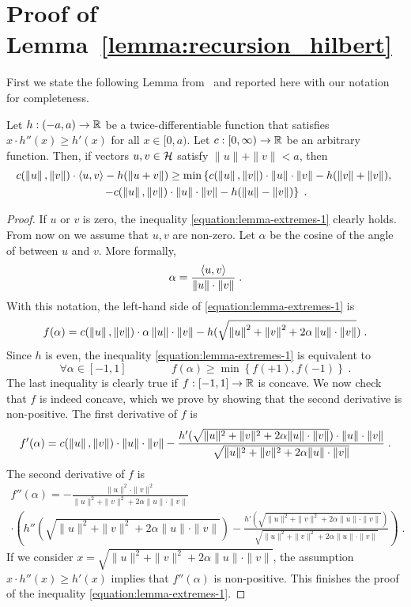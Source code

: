 \section{Proof of Lemma~\ref{lemma:recursion_hilbert}}
\label{section:hilbert-space-reduction}

First we state the following Lemma from~\cite{McMahanO14} and reported here with
our notation for completeness.

\begin{lemma}[Extremes]
\label{lemma:extremes}
Let $h:(-a,a) \to \mathbb{R}$ be a twice-differentiable function that
satisfies $x \cdot h''(x) \ge h'(x)$ for all $x \in [0,a)$. Let $c:[0,\infty) \to \mathbb{R}$
be an arbitrary function. Then, if vectors $u,v \in \mathcal{H}$ satisfy $\|u\| + \|v\| < a$, then
\begin{multline}
\label{equation:lemma-extremes-1}
c(\left\|{u}\right\|, \left\|{v}\right\|) \cdot \langle u, v \rangle - h(\left\|{u+v}\right\|)
\ge \min \left\{ c(\left\|{u}\right\|, \left\|{v}\right\|) \cdot \left\|{u}\right\| \cdot \left\|{v}\right\| - h(\left\|{v}\right\| + \left\|{v}\right\|), \right. \\
\left. - c(\left\|{u}\right\|, \left\|{v}\right\|) \cdot \left\|{u}\right\| \cdot \left\|{v}\right\| - h(\left\|{u}\right\| - \left\|{v}\right\|) \right\} \; .
\end{multline}
\end{lemma}
%
\begin{proof}
If $u$ or $v$ is zero, the inequality \eqref{equation:lemma-extremes-1} clearly
holds. From now on we assume that $u,v$ are non-zero. Let $\alpha$ be the cosine
of the angle of between $u$ and $v$. More formally,
\[
\alpha = \frac{\langle u, v \rangle}{\left\|{u}\right\| \cdot \left\|{v}\right\|} \; .
\]
With this notation, the left-hand side of \eqref{equation:lemma-extremes-1} is
\[
f(\alpha) = c(\left\|{u}\right\|, \left\|{v}\right\|) \cdot \alpha \left\|{u}\right\| \cdot \left\|{v}\right\| - h(\sqrt{\left\|{u}\right\|^2 + \left\|{v}\right\|^2 + 2 \alpha \left\|{u}\right\| \cdot \left\|{v}\right\|}) \; .
\]
Since $h$ is even, the inequality \eqref{equation:lemma-extremes-1} is equivalent to
\[
\forall \alpha \in [-1,1] \qquad \qquad f(\alpha) \ge \min \left\{f(+1), f(-1)\right\} \; .
\]
The last inequality is clearly true if $f:[-1,1] \to \mathbb{R}$ is concave. We now
check that $f$ is indeed concave, which we prove by showing that the second
derivative is non-positive. The first derivative of $f$ is
\[
f'(\alpha) = c(\left\|{u}\right\|, \left\|{v}\right\|) \cdot \|u\| \cdot \|v\| - \frac{h'(\sqrt{\|u\|^2 + \|v\|^2 + 2 \alpha \|u\| \cdot \|v\|}) \cdot \|u\| \cdot \|v\|}{\sqrt{\|u\|^2 + \|v\|^2 + 2 \alpha \|u\| \cdot \|v\|}} \; .
\]
The second derivative of $f$ is
\begin{multline*}
f''(\alpha) = - \frac{\|u\|^2 \cdot \|v\|^2}{\|u\|^2 + \|v\|^2 + 2 \alpha \|u\| \cdot \|v\|} \\
 \cdot \left( h''(\sqrt{\|u\|^2 + \|v\|^2 + 2 \alpha \|u\| \cdot \|v\|})  - \frac{h'(\sqrt{\|u\|^2 + \|v\|^2 + 2 \alpha \|u\| \cdot \|v\|})}{\sqrt{\|u\|^2 + \|v\|^2 + 2\alpha \|u\| \cdot \|v\|}}  \right) \; .
\end{multline*}
If we consider $x = \sqrt{\|u\|^2 + \|v\|^2 + 2 \alpha \|u\| \cdot \|v\|}$, the
assumption $x \cdot h''(x) \ge h'(x)$ implies that $f''(\alpha)$ is non-positive.
This finishes the proof of the inequality \eqref{equation:lemma-extremes-1}.
\end{proof}

